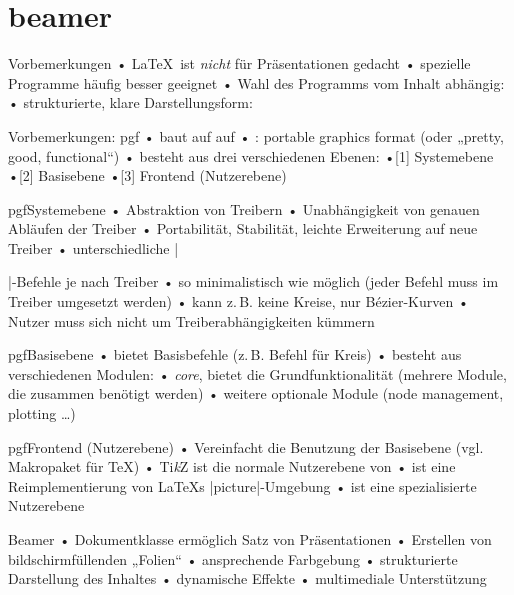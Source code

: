 

\def\TikZ{{\rmfamily Ti\textit{k}Z}\xspace}


\section{beamer}
\frame{\tableofcontents}
\begin{frame}{Vorbemerkungen}
• \LaTeX\ ist \emph{nicht} für Präsentationen gedacht
• spezielle Programme häufig besser geeignet
• Wahl des Programms vom Inhalt abhängig:
• strukturierte, klare Darstellungsform: 
\•
\end{frame}

\begin{frame}{Vorbemerkungen: pgf}
•  baut auf  auf
• : portable graphics format (oder „pretty, good, functional“)
•  besteht aus drei verschiedenen Ebenen:
•[1] Systemebene
•[2] Basisebene
•[3] Frontend (Nutzerebene)
\•
\end{frame}

\begin{frame}[fragile]{pgf}{Systemebene}
• Abstraktion von Treibern
• Unabhängigkeit von genauen Abläufen der Treiber
• Portabilität, Stabilität, leichte Erweiterung auf neue Treiber
• unterschiedliche |\special|-Befehle je nach Treiber
• so minimalistisch wie möglich (jeder Befehl muss im Treiber umgesetzt werden)
• kann z.\,B. keine Kreise, nur Bézier-Kurven
• Nutzer muss sich nicht um Treiberabhängigkeiten kümmern
\•
\end{frame}

\begin{frame}{pgf}{Basisebene}
• bietet Basisbefehle (z.\,B. Befehl für Kreis)
• besteht aus verschiedenen Modulen:
• \emph{core}, bietet die Grundfunktionalität (mehrere Module, die zusammen benötigt werden)
• weitere optionale Module (node management, plotting …)
\•
\end{frame}

\begin{frame}[fragile]{pgf}{Frontend (Nutzerebene)}
• Vereinfacht die Benutzung der Basisebene (vgl. Makropaket für \TeX)
• \TikZ ist die normale Nutzerebene von 
•  ist eine Reimplementierung von \LaTeX s |{picture}|-Umgebung
•  ist eine spezialisierte Nutzerebene
\•
\end{frame}

\begin{frame}{Beamer}
• Dokumentklasse  ermöglich Satz von Präsentationen\pause
• Erstellen von bildschirmfüllenden „Folien“
• ansprechende Farbgebung
• strukturierte Darstellung des Inhaltes
• dynamische Effekte
• multimediale Unterstützung
\•
\end{frame}

